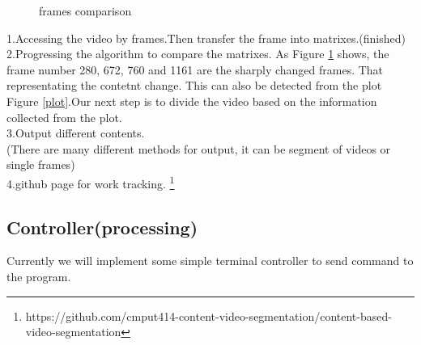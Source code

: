 \documentclass[11pt]{article} %
\begin{document}
    \begin{figure}
    \centering

    \caption{frames comparison}
    \label{picture}
    \end{figure}
1.Accessing the video by frames.Then transfer the frame into matrixes.(finished)\\
2.Progressing the algorithm to compare the matrixes. As Figure \ref{picture} shows, the frame number 280, 672, 760 and 1161 are the sharply changed frames. That representating the contetnt change. This can also be detected from the plot Figure \ref{plot}.Our next step is to divide the video based on the information
collected from the plot.\\
3.Output different contents. \\
(There are many different methods for output, it can be segment of videos or single frames)\\
4.github page for work tracking.
\footnote{https://github.com/cmput414-content-video-segmentation/content-based-video-segmentation}
\subsection{Controller(processing)}
Currently we will implement some simple terminal controller to send command to the program.
\end{document}
